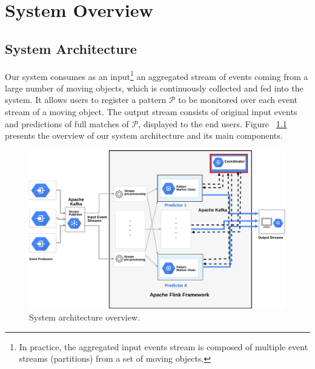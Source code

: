 

\chapter{System Overview}
\label{chapter:overview}
\section{System Architecture}
\label{sec:architecture}
Our system consumes as an input\footnote{In practice, the aggregated input events stream is composed of multiple event streams (partitions) from a set of moving objects.} an aggregated stream of events coming from a large number of moving objects, which is continuously collected and fed into the system. It allows users to register a pattern $\mathcal{P}$ to be monitored over each event stream of a moving object. The output stream consists of original input events and predictions of full matches of $\mathcal{P}$, displayed to the end users. Figure ~\ref{fig:architecture} presents the overview of our system architecture and its main components.      


\begin{figure}[h]
	
	\includegraphics[width=\linewidth]{chapters/figures/system.png}
	
	\caption{System architecture overview.}
	\label{fig:architecture}
\end{figure}

